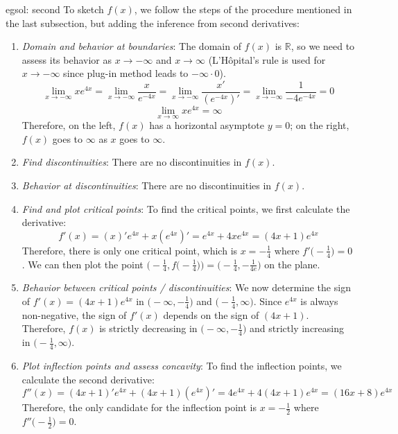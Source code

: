 \begin{egsol}[]{egsol: second}
    To sketch $f(x)$, we follow the steps of the procedure mentioned in the last subsection, but adding the inference from second derivatives:
    
    \begin{enumerate}
        \item \textit{Domain and behavior at boundaries}: The domain of $f(x)$ is $\mathbb{R}$, so we need to assess its behavior as $x \rightarrow -\infty$ and $x \rightarrow \infty$ (L'Hôpital's rule is used for $x \rightarrow -\infty$ since plug-in method leads to $-\infty \cdot 0$). 
        \[\lim_{x \rightarrow -\infty} xe^{4x} = \lim_{x \rightarrow -\infty} \frac{x}{e^{-4x}} = \lim_{x \rightarrow -\infty} \frac{x'}{(e^{-4x})'} = \lim_{x \rightarrow -\infty} \frac{1}{-4e^{-4x}} = 0\]
        \[\lim_{x \rightarrow \infty} xe^{4x} = \infty\]
        Therefore, on the left, $f(x)$ has a horizontal asymptote $y=0$; on the right, $f(x)$ goes to $\infty$ as $x$ goes to $\infty$.
        \item \textit{Find discontinuities}: There are no discontinuities in $f(x)$.
        \item \textit{Behavior at discontinuities}: There are no discontinuities in $f(x)$.
        \item \textit{Find and plot critical points}: To find the critical points, we first calculate the derivative:
        \[f'(x) = (x)'e^{4x} + x(e^{4x})' = e^{4x} + 4xe^{4x} = (4x+1)e^{4x}\]
        Therefore, there is only one critical point, which is $x = -\frac{1}{4}$ where $f'\big(-\frac{1}{4}\big) = 0$.  We can then plot the point $\big(-\frac{1}{4},f\big(-\frac{1}{4}\big)\big) = \big(-\frac{1}{4},-\frac{1}{4e})$ on the plane.
        \item \textit{Behavior between critical points / discontinuities}: We now determine the sign of $f'(x) = (4x+1)e^{4x}$ in $\big(-\infty, -\frac{1}{4}\big)$ and $\big(-\frac{1}{4}, \infty\big)$.  Since $e^{4x}$ is always non-negative, the sign of $f'(x)$ depends on the sign of $(4x+1)$.  Therefore, $f(x)$ is strictly decreasing in $\big(-\infty, -\frac{1}{4}\big)$ and strictly increasing in $\big(-\frac{1}{4}, \infty\big)$.
        \item \textit{Plot inflection points and assess concavity}: To find the inflection points, we calculate the second derivative:
        \[f''(x) = (4x+1)'e^{4x} + (4x+1)(e^{4x})' = 4e^{4x} + 4(4x+1)e^{4x} = (16x+8)e^{4x}\]
        Therefore, the only candidate for the inflection point is $x = -\frac{1}{2}$ where $f''\big(-\frac{1}{2}\big) = 0$.  
        

\end{enumerate}
\end{egsol}
